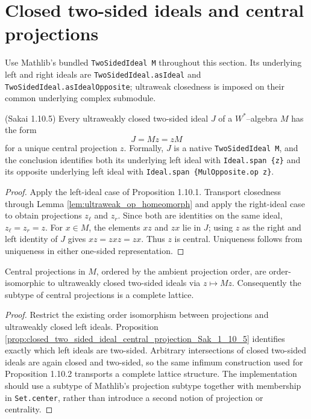 \section{Closed two-sided ideals and central projections}

Use Mathlib's bundled \texttt{TwoSidedIdeal M} throughout this section.  Its underlying left and
right ideals are \texttt{TwoSidedIdeal.asIdeal} and
\texttt{TwoSidedIdeal.asIdealOpposite}; ultraweak closedness is imposed on their common underlying
complex submodule.

\begin{proposition}
  \label{prop:closed_two_sided_ideal_central_projection_Sak_1_10_5} (Sakai 1.10.5)
  \notready
  Every ultraweakly closed two-sided ideal $J$ of a $W^{*}$--algebra $M$ has the form
  \[
    J=Mz=zM
  \]
  for a unique central projection $z$.  Formally, $J$ is a native
  \texttt{TwoSidedIdeal M}, and the conclusion identifies both its underlying left ideal with
  \texttt{Ideal.span \{z\}} and its opposite underlying left ideal with
  \texttt{Ideal.span \{MulOpposite.op z\}}.
\end{proposition}

\begin{proof}
  \notready
  Apply the left-ideal case of Proposition 1.10.1.  Transport closedness through Lemma
  \ref{lem:ultraweak_op_homeomorph} and apply the right-ideal case to obtain projections
  $z_{\ell}$ and $z_{r}$.  Since both are identities on the same ideal,
  $z_{\ell}=z_{r}=z$.  For $x\in M$, the elements $xz$ and $zx$ lie in $J$; using $z$ as the right
  and left identity of $J$ gives $xz=zxz=zx$.  Thus $z$ is central.  Uniqueness follows from
  uniqueness in either one-sided representation.
\end{proof}

\begin{corollary}
  \label{cor:central_projection_closed_ideal_order_iso}
  \notready
  Central projections in $M$, ordered by the ambient projection order, are order-isomorphic to
  ultraweakly closed two-sided ideals via $z\mapsto Mz$.  Consequently the subtype of central
  projections is a complete lattice.
\end{corollary}

\begin{proof}
  \notready
  Restrict the existing order isomorphism between projections and ultraweakly closed left ideals.
  Proposition \ref{prop:closed_two_sided_ideal_central_projection_Sak_1_10_5} identifies exactly
  which left ideals are two-sided.  Arbitrary intersections of closed two-sided ideals are again
  closed and two-sided, so the same infimum construction used for Proposition 1.10.2 transports a
  complete lattice structure.  The implementation should use a subtype of Mathlib's projection
  subtype together with membership in \texttt{Set.center}, rather than introduce a second notion
  of projection or centrality.
\end{proof}

